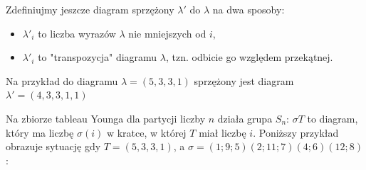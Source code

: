 \begin{center}
\end{center}

Zdefiniujmy jeszcze diagram sprzężony $\lambda'$ do $\lambda$ na dwa sposoby: 
\begin{itemize}
  \item $\lambda'_i$ to liczba wyrazów $\lambda$ nie mniejszych od $i$,
  \item $\lambda'_i$ to "transpozycja" diagramu $\lambda$, tzn. odbicie go względem przekątnej.
\end{itemize}

Na przykład do diagramu $\lambda=(5, 3, 3, 1)$ sprzężony jest diagram $\lambda'=(4, 3, 3, 1, 1)$
\begin{center}
\end{center}
\bigskip

Na zbiorze tableau Younga dla partycji liczby $n$ działa grupa $S_n$: $\sigma T$ to diagram, który ma liczbę $\sigma(i)$ w kratce, w której $T$ miał liczbę $i$. Poniższy przykład obrazuje sytuację gdy $T=(5,3,3,1)$, a $\sigma=(1; 9; 5)(2; 11; 7)(4; 6)(12; 8)$:
\begin{center}
\end{center}

